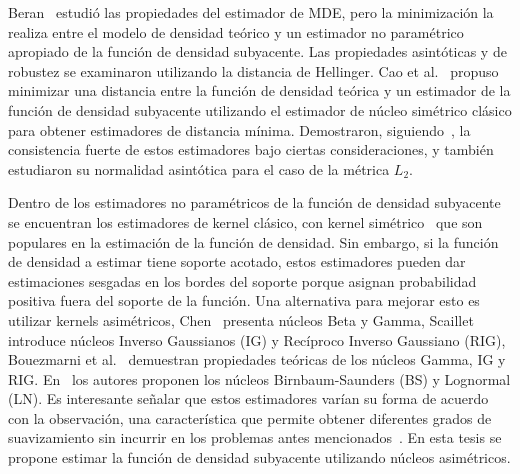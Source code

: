 Beran~\cite{beran1977} estudió las propiedades del estimador de MDE, pero la minimización la realiza entre el modelo de densidad teórico y un estimador no paramétrico apropiado de la función de densidad subyacente.
Las propiedades asintóticas y de robustez se examinaron utilizando la distancia de Hellinger.
Cao et al.~\cite {cao1995minimum} propuso minimizar una distancia entre la función de densidad teórica y un estimador de la función de densidad subyacente utilizando el estimador de núcleo simétrico clásico para obtener estimadores de distancia mínima. Demostraron, siguiendo~\cite{parr1982}, la consistencia fuerte de estos estimadores bajo ciertas consideraciones, y también estudiaron su normalidad asintótica para el caso de la métrica $ L_2 $.


Dentro de los estimadores no paramétricos de la función de densidad subyacente se encuentran los estimadores de kernel clásico, con kernel simétrico~\cite{Silverman1986} que son populares en la estimación de la función de densidad. Sin embargo, si la función de densidad a estimar tiene soporte acotado, estos estimadores pueden dar estimaciones sesgadas en los bordes del soporte porque asignan probabilidad positiva fuera del soporte de la función. Una alternativa para mejorar esto es utilizar kernels asimétricos, Chen~\cite{chen1999, chensx2000} presenta núcleos Beta y Gamma, Scaillet~\cite {Scaillet2004} introduce núcleos Inverso Gaussianos (IG) y Recíproco Inverso Gaussiano (RIG), Bouezmarni et al.~\cite {bouezmarni2005} demuestran propiedades teóricas de los núcleos Gamma, IG y RIG. En~\cite{Jin2003} los autores proponen los núcleos Birnbaum-Saunders (BS) y Lognormal (LN). Es interesante señalar que  estos estimadores varían su forma de acuerdo con la observación, una característica que permite obtener diferentes grados de suavizamiento sin incurrir en los problemas antes mencionados~\cite{Scaillet2004}. En esta tesis se propone estimar la función de densidad subyacente utilizando núcleos asimétricos.

